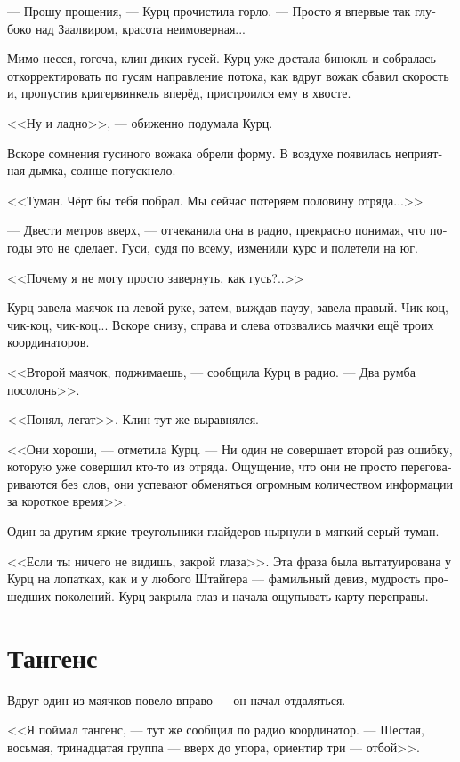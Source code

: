\documentclass[a4paper,12pt,fleqn]{book}\usepackage{polyglossia}\setdefaultlanguage[babelshorthands=true]{russian}\setotherlanguage{english}\defaultfontfeatures{Ligatures=TeX,Mapping=tex-text}\usepackage{xcolor}\newcommand{\ml}[3]{#2}
\begin{document}
--- Прошу прощения, --- Курц прочистила горло.
--- Просто я впервые так глубоко над Заалвиром, красота неимоверная...

Мимо несся, гогоча, клин диких гусей.
Курц уже достала бинокль и собралась откорректировать по гусям направление потока, как вдруг вожак сбавил скорость и, пропустив кригервинкель вперёд, пристроился ему в хвосте.

<<Ну и ладно>>, --- обиженно подумала Курц.

Вскоре сомнения гусиного вожака обрели форму.
В воздухе появилась неприятная дымка, солнце потускнело.

<<Туман.
Чёрт бы тебя побрал.
Мы сейчас потеряем половину отряда...>>

--- Двести метров вверх, --- отчеканила она в радио, прекрасно понимая, что погоды это не сделает.
Гуси, судя по всему, изменили курс и полетели на юг.

<<Почему я не могу просто завернуть, как гусь?..>>

Курц завела маячок на левой руке, затем, выждав паузу, завела правый.
Чик-коц, чик-коц, чик-коц...
Вскоре снизу, справа и слева отозвались маячки ещё троих координаторов.

<<Второй маячок, поджимаешь, --- сообщила Курц в радио.
\ml{$0$}
{--- Два румба посолонь>>.}
{``\textit{Two rhumbs sunward.}''}

\ml{$0$}
{<<Понял, легат>>.}
{``Roger that, legate.''}
Клин тут же выравнялся.

<<Они хороши, --- отметила Курц.
--- Ни один не совершает второй раз ошибку, которую уже совершил кто-то из отряда.
Ощущение, что они не просто переговариваются без слов, они успевают обменяться огромным количеством информации за короткое время>>.

Один за другим яркие треугольники глайдеров нырнули в мягкий серый туман.

<<Если ты ничего не видишь, закрой глаза>>.
Эта фраза была вытатуирована у Курц на лопатках, как и у любого Штайгера --- фамильный девиз, мудрость прошедших поколений.
Курц закрыла глаз и начала ощупывать карту переправы.

\section{Тангенс}

Вдруг один из маячков повело вправо --- он начал отдаляться.

<<Я поймал тангенс, --- тут же сообщил по радио координатор.
\ml{$0$}
{--- Шестая, восьмая, тринадцатая группа --- вверх до упора, ориентир три --- отбой>>.}
{``Group six, eight, thirteen, full up, beacon three is off.''}
\end{document}
